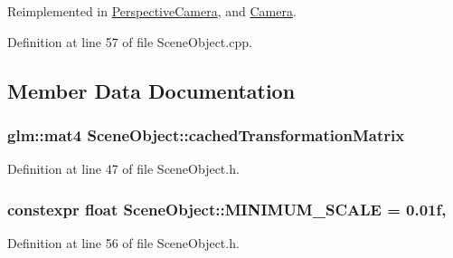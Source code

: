 Reimplemented in \hyperlink{class_perspective_camera_a2f17fb07425e2146d5692805753fa368}{Perspective\+Camera}, and \hyperlink{class_camera_aea640c892a3807671d8ca49616d96eda}{Camera}.



Definition at line 57 of file Scene\+Object.\+cpp.



\subsection{Member Data Documentation}
\hypertarget{class_scene_object_aac3f13eea8a7b455e8cffc6eceef211c}{}
\subsubsection[{cached\+Transformation\+Matrix}]{\setlength{\rightskip}{0pt plus 5cm}glm\+::mat4 Scene\+Object\+::cached\+Transformation\+Matrix\hspace{0.3cm}{\ttfamily [protected]}}\label{class_scene_object_aac3f13eea8a7b455e8cffc6eceef211c}


Definition at line 47 of file Scene\+Object.\+h.

\hypertarget{class_scene_object_a5c61f60925abade4340e7e56c68a989a}{}
\subsubsection[{M\+I\+N\+I\+M\+U\+M\+\_\+\+S\+C\+A\+L\+E}]{\setlength{\rightskip}{0pt plus 5cm}constexpr float Scene\+Object\+::\+M\+I\+N\+I\+M\+U\+M\+\_\+\+S\+C\+A\+L\+E = 0.\+01f\hspace{0.3cm}{\ttfamily [static]}, {\ttfamily [protected]}}\label{class_scene_object_a5c61f60925abade4340e7e56c68a989a}


Definition at line 56 of file Scene\+Object.\+h.

\hypertarget{class_scene_object_a62d236f4f5c52b66bd02d13d09b6ce5e}{}
